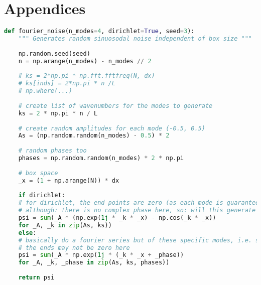 \addchapheadtotoc

\chapter{Appendices}


\begin{lstlisting}[language=Python, caption={A function used to generate an initial excited state independent of the box size.}, label={lst:fouriernoise}]
def fourier_noise(n_modes=4, dirichlet=True, seed=3):
	""" Generates random sinuosodal noise independent of box size """
	
	np.random.seed(seed)
	n = np.arange(n_modes) - n_modes // 2
	
	# ks = 2*np.pi * np.fft.fftfreq(N, dx)
	# ks[inds] = 2*np.pi * n /L
	# np.where(...)
	
	# create list of wavenumbers for the modes to generate
	ks = 2 * np.pi * n / L
	
	# create random amplitudes for each mode (-0.5, 0.5)
	As = (np.random.random(n_modes) - 0.5) * 2
	
	# random phases too
	phases = np.random.random(n_modes) * 2 * np.pi
	
	# box space
	_x = (1 + np.arange(N)) * dx
	
	if dirichlet:
	# for dirichlet, the end points are zero (as each mode is guaranteed to fit in the box, as phase=0)
	# although: there is no complex phase here, so: will this generate turbulance as the phase is uniform?
	psi = sum(_A * (np.exp(1j * _k * _x) - np.cos(_k * _x))
	for _A, _k in zip(As, ks))
	else:
	# basically do a fourier series but of these specific modes, i.e. sum up each sine wave
	# the ends may not be zero here
	psi = sum(_A * np.exp(1j * (_k * _x + _phase))
	for _A, _k, _phase in zip(As, ks, phases))
	
	return psi
\end{lstlisting}